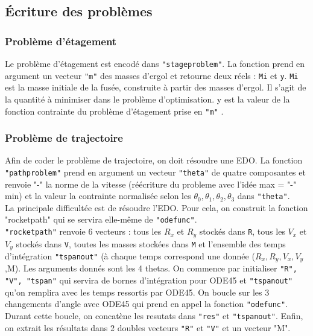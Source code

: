 \subsection{\'Ecriture des problèmes}\medbreak
\subsubsection{Problème d'étagement}\medbreak
Le problème d'étagement est encodé dans \texttt{"stageproblem"}. La fonction prend en argument un vecteur \texttt{"m"} des masses d'ergol et retourne deux réels : \texttt{Mi} et \texttt{y}. \texttt{Mi} est la masse initiale de la fusée, construite à partir des masses d'ergol. Il s'agit de la quantité à minimiser dans le problème d'optimisation. y est la valeur de la fonction contrainte du problème d'étagement prise en \texttt{"m"} .\medbreak
\subsubsection{Problème de trajectoire}\medbreak

Afin de coder le problème de trajectoire, on doit résoudre une EDO. La fonction \texttt{"pathproblem"} prend en argument un vecteur \texttt{"theta"} de quatre composantes et renvoie "-" la norme de la vitesse (réécriture du probleme avec l'idée max = "-" min) et la valeur la contrainte normalisée selon les $\theta_0, \theta_1, \theta_2, \theta_3$ dans \texttt{"theta"}. \\
La principale difficultée est de résoudre l'EDO. Pour cela, on construit la fonction "rocketpath" qui se servira elle-même de \texttt{"odefunc"}.\\
\texttt{"rocketpath"} renvoie 6 vecteurs : tous les $R_x$ et $R_y$ stockés dans \texttt{R}, tous les $V_x$ et $V_y$ stockés dans \texttt{V}, toutes les masses stockées dans \texttt{M} et l'ensemble des temps d'intégration \texttt{"tspanout"} (à chaque temps correspond une donnée ($R_x,R_y,V_x,V_y$,M). Les arguments donnés sont les 4 thetas. On commence par initialiser \texttt{"R", "V", "tspan"} qui servira de bornes d'intégration pour ODE45 et \texttt{"tspanout"} qu'on remplira avec les temps ressortis par ODE45. On boucle sur les 3 changements d'angle avec ODE45 qui prend en appel la fonction \texttt{"odefunc"}. Durant cette boucle, on concatène les resutats dans \texttt{"res"} et \texttt{"tspanout"}. Enfin, on extrait les résultats dans 2 doubles vecteurs \texttt{"R"} et \texttt{"V"} et un vecteur "M".\\

